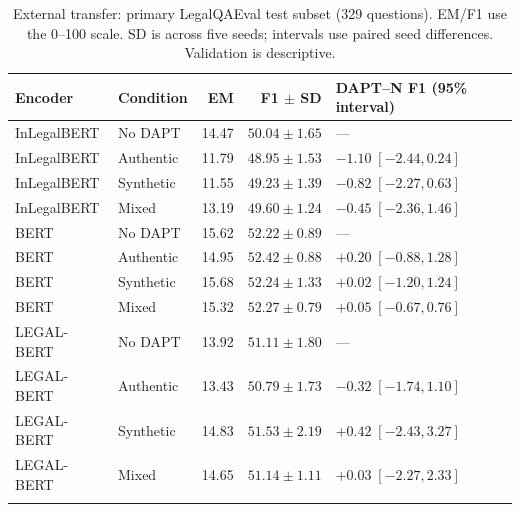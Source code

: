 \begin{table}[!htbp]
\caption{External transfer: primary LegalQAEval test subset (329 questions).
EM/F1 use the 0--100 scale. SD is across five seeds; intervals
use paired seed differences. Validation is descriptive.}
\label{tab:legalqaeval_test}
\centering\scriptsize
\setlength{\tabcolsep}{3pt}
\begin{tabular}{@{}llrr>{\raggedright\arraybackslash}p{3.8cm}@{}}
\toprule
Encoder & Condition & EM & F1 $\pm$ SD & DAPT--N F1 (95\% interval) \\
\midrule
InLegalBERT & No DAPT & 14.47 & $50.04\pm1.65$ & --- \\
InLegalBERT & Authentic & 11.79 & $48.95\pm1.53$ & $-1.10\;[-2.44,0.24]$ \\
InLegalBERT & Synthetic & 11.55 & $49.23\pm1.39$ & $-0.82\;[-2.27,0.63]$ \\
InLegalBERT & Mixed & 13.19 & $49.60\pm1.24$ & $-0.45\;[-2.36,1.46]$ \\
\addlinespace
BERT & No DAPT & 15.62 & $52.22\pm0.89$ & --- \\
BERT & Authentic & 14.95 & $52.42\pm0.88$ & $+0.20\;[-0.88,1.28]$ \\
BERT & Synthetic & 15.68 & $52.24\pm1.33$ & $+0.02\;[-1.20,1.24]$ \\
BERT & Mixed & 15.32 & $52.27\pm0.79$ & $+0.05\;[-0.67,0.76]$ \\
\addlinespace
LEGAL-BERT & No DAPT & 13.92 & $51.11\pm1.80$ & --- \\
LEGAL-BERT & Authentic & 13.43 & $50.79\pm1.73$ & $-0.32\;[-1.74,1.10]$ \\
LEGAL-BERT & Synthetic & 14.83 & $51.53\pm2.19$ & $+0.42\;[-2.43,3.27]$ \\
LEGAL-BERT & Mixed & 14.65 & $51.14\pm1.11$ & $+0.03\;[-2.27,2.33]$ \\
\addlinespace
\bottomrule
\end{tabular}
\end{table}

